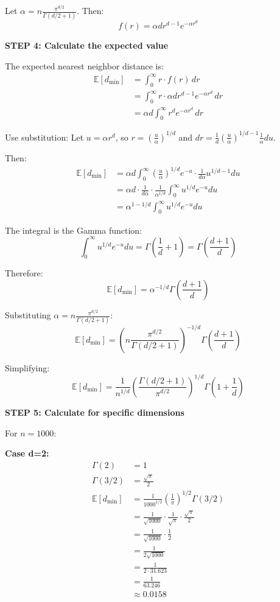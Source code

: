 \documentclass[12pt]{article}
\begin{document}
\begin{solution}
Let \(\alpha = n \frac{\pi^{d/2}}{\Gamma(d/2 + 1)}\). Then:
\[
f(r) = \alpha d r^{d-1} e^{-\alpha r^d}
\]

\textbf{STEP 4: Calculate the expected value}

The expected nearest neighbor distance is:
\begin{align*}
\mathbb{E}[d_{\min}] &= \int_0^{\infty} r \cdot f(r) \, dr \\
&= \int_0^{\infty} r \cdot \alpha d r^{d-1} e^{-\alpha r^d} \, dr \\
&= \alpha d \int_0^{\infty} r^d e^{-\alpha r^d} \, dr
\end{align*}

Use substitution: Let \(u = \alpha r^d\), so \(r = \left(\frac{u}{\alpha}\right)^{1/d}\) and \(dr = \frac{1}{d} \left(\frac{u}{\alpha}\right)^{1/d - 1} \frac{1}{\alpha} du\).

Then:
\begin{align*}
\mathbb{E}[d_{\min}] &= \alpha d \int_0^{\infty} \left(\frac{u}{\alpha}\right)^{1/d} e^{-u} \cdot \frac{1}{d\alpha} u^{1/d - 1} du \\
&= \alpha d \cdot \frac{1}{d\alpha} \cdot \frac{1}{\alpha^{1/d}} \int_0^{\infty} u^{1/d} e^{-u} du \\
&= \alpha^{1 - 1/d} \int_0^{\infty} u^{1/d} e^{-u} du
\end{align*}

The integral is the Gamma function:
\[
\int_0^{\infty} u^{1/d} e^{-u} du = \Gamma\left(\frac{1}{d} + 1\right) = \Gamma\left(\frac{d+1}{d}\right)
\]

Therefore:
\[
\mathbb{E}[d_{\min}] = \alpha^{-1/d} \Gamma\left(\frac{d+1}{d}\right)
\]

Substituting \(\alpha = n \frac{\pi^{d/2}}{\Gamma(d/2 + 1)}\):
\[
\mathbb{E}[d_{\min}] = \left(n \frac{\pi^{d/2}}{\Gamma(d/2 + 1)}\right)^{-1/d} \Gamma\left(\frac{d+1}{d}\right)
\]

Simplifying:
\[
\boxed{\mathbb{E}[d_{\min}] = \frac{1}{n^{1/d}} \left(\frac{\Gamma(d/2 + 1)}{\pi^{d/2}}\right)^{1/d} \Gamma\left(1 + \frac{1}{d}\right)}
\]

\textbf{STEP 5: Calculate for specific dimensions}

For \(n = 1000\):

\textbf{Case d=2:}
\begin{align*}
\Gamma(2) &= 1 \\
\Gamma(3/2) &= \frac{\sqrt{\pi}}{2} \\
\mathbb{E}[d_{\min}] &= \frac{1}{1000^{1/2}} \left(\frac{1}{\pi}\right)^{1/2} \Gamma(3/2) \\
&= \frac{1}{\sqrt{1000}} \cdot \frac{1}{\sqrt{\pi}} \cdot \frac{\sqrt{\pi}}{2} \\
&= \frac{1}{\sqrt{1000}} \cdot \frac{1}{2} \\
&= \frac{1}{2\sqrt{1000}} \\
&= \frac{1}{2 \cdot 31.623} \\
&= \frac{1}{63.246} \\
&\approx \boxed{0.0158}
\end{align*}


\end{solution}
\end{document}

